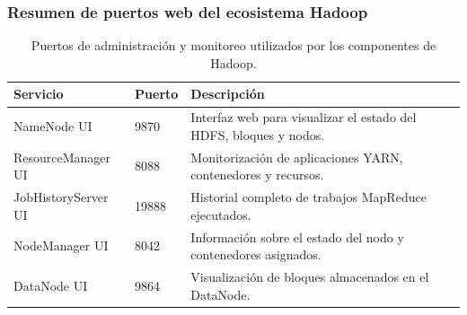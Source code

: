 \subsubsection*{Resumen de puertos web del ecosistema Hadoop}

\begin{table}[H]
\centering
\begin{tabular}{|p{3cm}|p{3cm}|p{7cm}|}
\hline
\textbf{Servicio} & \textbf{Puerto} & \textbf{Descripción} \\
\hline
NameNode UI & 9870 & Interfaz web para visualizar el estado del HDFS, bloques y nodos. \\
\hline
ResourceManager UI & 8088 & Monitorización de aplicaciones YARN, contenedores y recursos. \\
\hline
JobHistoryServer UI & 19888 & Historial completo de trabajos MapReduce ejecutados. \\
\hline
NodeManager UI & 8042 & Información sobre el estado del nodo y contenedores asignados. \\
\hline
DataNode UI & 9864 & Visualización de bloques almacenados en el DataNode. \\
\hline
\end{tabular}
\caption{Puertos de administración y monitoreo utilizados por los componentes de Hadoop.}
\end{table}
